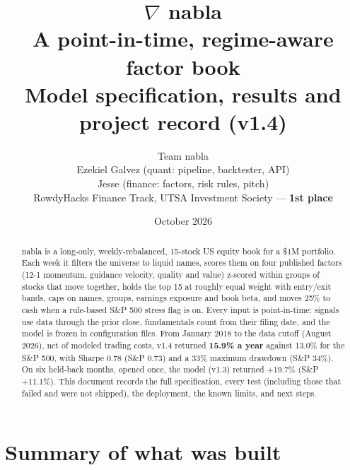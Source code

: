 \documentclass[11pt]{article}
\title{\textbf{\color{nabla}$\nabla$ nabla}\\[4pt]
\large A point-in-time, regime-aware factor book\\
Model specification, results and project record (v1.4)}
\author{Team nabla\\ Ezekiel Galvez (quant: pipeline, backtester, API)\\ Jesse (finance: factors, risk rules, pitch)\\
RowdyHacks Finance Track, UTSA Investment Society --- \textbf{1st place}}
\date{October 2026}
\begin{document}
\sloppy
\maketitle

\begin{abstract}
\noindent nabla is a long-only, weekly-rebalanced, 15-stock US equity book for a \$1M portfolio. Each week it filters the
universe to liquid names, scores them on four published factors (12-1 momentum, guidance velocity, quality and value)
z-scored within groups of stocks that move together, holds the top 15 at roughly equal weight with entry/exit bands,
caps on names, groups, earnings exposure and book beta, and moves 25\% to cash when a rule-based S\&P 500 stress flag is
on. Every input is point-in-time: signals use data through the prior close, fundamentals count from their filing date,
and the model is frozen in configuration files. From January 2018 to the data cutoff (August 2026), net of modeled
trading costs, v1.4 returned \textbf{15.9\% a year} against 13.0\% for the S\&P 500, with Sharpe 0.78 (S\&P 0.73) and
a 33\% maximum drawdown (S\&P 34\%). On six held-back months, opened once, the model (v1.3) returned +19.7\% (S\&P
+11.1\%). This document records the full specification, every test (including those that failed and were not
shipped), the deployment, the known limits, and next steps.
\end{abstract}

\tableofcontents
\newpage

\section{Summary of what was built}
\end{document}
